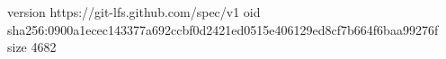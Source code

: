 version https://git-lfs.github.com/spec/v1
oid sha256:0900a1ecec143377a692ccbf0d2421ed0515e406129ed8cf7b664f6baa99276f
size 4682
